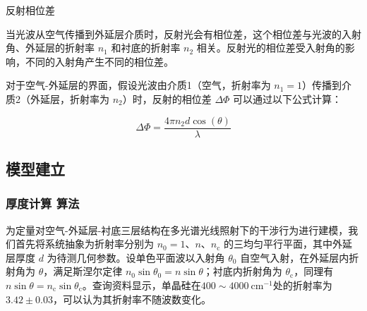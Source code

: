 \documentclass[withoutpreface,bwprint]{cumcmthesis}
\begin{document}
\begin{enumerate}
	 反射相位差
	 
	 当光波从空气传播到外延层介质时，反射光会有相位差，这个相位差与光波的入射角、外延层的折射率 \(n_1\) 和衬底的折射率 \(n_2\) 相关。反射光的相位差受入射角的影响，不同的入射角产生不同的相位差。
	 
	 对于空气-外延层的界面，假设光波由介质1（空气，折射率为 \(n_1 = 1\)）传播到介质2（外延层，折射率为 \(n_2\)）时，反射的相位差 \(\Delta \Phi\) 可以通过以下公式计算：
	 
	 \begin{equation}
	 \Delta \Phi = \frac{4\pi n_2 d \cos(\theta)}{\lambda}\tag{16}
	 \end{equation}
	 
	 
	 
	
	    
\end{enumerate}
\subsection{模型建立}
\subsubsection{厚度计算 算法}
为定量对空气-外延层-衬底三层结构在多光谱光线照射下的干涉行为进行建模，我们首先将系统抽象为折射率分别为 \(n_0=1\)、\(n\)、\(n_\mathrm{c}\) 的三均匀平行平面，其中外延层厚度 \(d\) 为待测几何参数。设单色平面波以入射角 \(\theta_0\) 自空气入射，在外延层内折射角为 \(\theta\)，满足斯涅尔定律 \(n_0\sin\theta_0=n\sin\theta\)；衬底内折射角为 \(\theta_\mathrm{c}\)，同理有 \(n\sin\theta=n_\mathrm{c}\sin\theta_\mathrm{c}\)。查询资料显示，单晶硅在$400\sim4000\ \mathrm{cm}^{-1}$处的折射率为$3.42\pm0.03$，可以认为其折射率不随波数变化。
\end{document}
